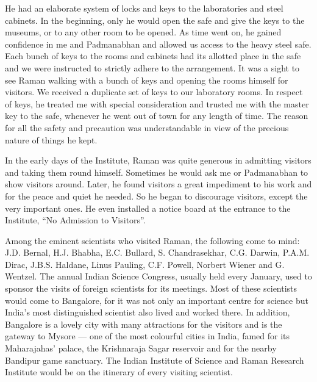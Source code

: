 He had an elaborate system of locks and keys to the
laboratories and steel cabinets. In the beginning, only he would
open the safe and give the keys to the museums, or to any other
room to be opened. As time went on, he gained confidence in
me and Padmanabhan and allowed us access to the heavy steel
safe. Each bunch of keys to the rooms and cabinets had its allotted
place in the safe and we were instructed to strictly adhere to the
arrangement. It was a sight to see Raman walking with a bunch
of keys and opening the rooms himself for visitors. We received
a duplicate set of keys to our laboratory rooms. In respect of
keys, he treated me with special consideration and trusted me with
the master key to the safe, whenever he went out of town for any
length of time. The reason for all the safety and precaution was
understandable in view of the precious nature of things he kept.

In the early days of the Institute, Raman was quite generous
in admitting visitors and taking them round himself. Sometimes
he would ask me or Padmanabhan to show visitors around. Later,
he found visitors a great impediment to his work and for the peace
and quiet he needed. So he began to discourage visitors, except
the very important ones. He even installed a notice board at the
entrance to the Institute, ``No Admission to Visitors''.

Among the eminent scientists who visited Raman, the
following come to mind: J.D. Bernal, H.J. Bhabha, E.C. Bullard,
S. Chandrasekhar, C.G. Darwin, P.A.M. Dirac, J.B.S. Haldane,
Linus Pauling, C.F. Powell, Norbert Wiener and G. Wentzel. The annual Indian Science Congress,
 usually held every January, used to sponsor the visits of foreign scientists for its meetings.
Most of these scientists would come to Bangalore, for it was not
only an important centre for science but India's most distinguished
scientist also lived and worked there. In addition, Bangalore is
a lovely city with many attractions for the visitors and is the
gateway to Mysore --- one of the most colourful cities in India,
famed for its Maharajahas' palace, the Krishnaraja Sagar
reservoir and for the nearby Bandipur game sanctuary. The Indian
Institute of Science and Raman Research Institute would be on
the itinerary of every visiting scientist.

